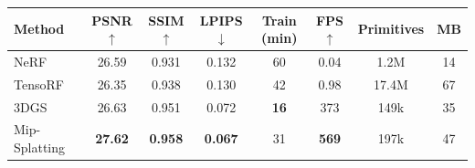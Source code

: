 \begin{tabular}{@{}lccccccc@{}}\toprule
Method & PSNR$\uparrow$ & SSIM$\uparrow$ & LPIPS$\downarrow$ & Train (min) & FPS$\uparrow$ & Primitives & MB \\\midrule
NeRF~\cite{mildenhall2020nerf} & 26.59 & 0.931 & 0.132 & 60 & 0.04 & 1.2M & 14 \\
TensoRF~\cite{chen2022tensorf} & 26.35 & 0.938 & 0.130 & 42 & 0.98 & 17.4M & 67 \\
3DGS~\cite{kerbl20233dgs} & 26.63 & 0.951 & 0.072 & \textbf{16} & 373 & 149k & 35 \\
Mip-Splatting~\cite{yu2024mip} & \textbf{27.62} & \textbf{0.958} & \textbf{0.067} & 31 & \textbf{569} & 197k & 47 \\
\bottomrule\end{tabular}
